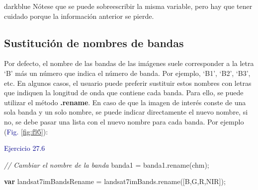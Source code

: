 \documentclass[
  12pt,
  letterpaper,
  twoside]{book}
\newenvironment{Shaded}{\begin{snugshade}}{\end{snugshade}}
\newcommand{\CommentTok}[1]{\textcolor[rgb]{0.24,0.58,0.00}{\textit{#1}}}
\newcommand{\ControlFlowTok}[1]{\textcolor[rgb]{0.00,0.00,0.00}{\textbf{#1}}}
\newcommand{\FunctionTok}[1]{\textcolor[rgb]{0.48,0.12,0.64}{#1}}
\newcommand{\NormalTok}[1]{#1}
\newcommand{\OperatorTok}[1]{\textcolor[rgb]{0.00,0.00,0.00}{#1}}
\newcommand{\StringTok}[1]{\textcolor[rgb]{0.87,0.29,0.22}{#1}}
\newcommand\boldpurple[1]{\textcolor{darkpurple}{\textbf{#1}}}
\begin{document}
\begin{bluebox2}

\begin{awesomeblock}{5pt}{\faLightbulb}{darkblue}
Nótese que se puede sobreescribir la misma variable, pero hay que tener cuidado porque la información anterior se pierde.

\end{awesomeblock}

\end{bluebox2}

\hypertarget{sustituciuxf3n-de-nombres-de-bandas}{%
\subsection*{Sustitución de nombres de bandas}\label{sustituciuxf3n-de-nombres-de-bandas}}

Por defecto, el nombre de las bandas de las imágenes suele corresponder a la letra `B' más un número que indica el número de banda. Por ejemplo, `B1', `B2', `B3', etc. En algunos casos, el usuario puede preferir sustituir estos nombres con letras que indiquen la longitud de onda que contiene cada banda. Para ello, se puede utilizar el método \boldpurple{.rename}. En caso de que la imagen de interés conste de una sola banda y un solo nombre, se puede indicar directamente el nuevo nombre, si no, se debe pasar una lista con el nuevo nombre para cada banda. Por ejemplo (\textcolor{darkblue}{Fig.} \ref{fig:f95}):

\textcolor{darkblue}{Ejercicio 27.6}

\begin{Shaded}
\begin{Highlighting}[]
\CommentTok{// Cambiar el nombre de la banda }
\NormalTok{banda1 }\OperatorTok{=}\NormalTok{ banda1}\OperatorTok{.}\FunctionTok{rename}\NormalTok{(}\StringTok{\textquotesingle{}chm\textquotesingle{}}\NormalTok{)}\OperatorTok{;}

\ControlFlowTok{var}\NormalTok{ landsat7imBandsRename }\OperatorTok{=}\NormalTok{ landsat7imBands}\OperatorTok{.}\FunctionTok{rename}\NormalTok{([}\StringTok{\textquotesingle{}B\textquotesingle{}}\OperatorTok{,}\StringTok{\textquotesingle{}G\textquotesingle{}}\OperatorTok{,}\StringTok{\textquotesingle{}R\textquotesingle{}}\OperatorTok{,}\StringTok{\textquotesingle{}NIR\textquotesingle{}}\NormalTok{])}\OperatorTok{;}
\end{Highlighting}
\end{Shaded}
\end{document}
